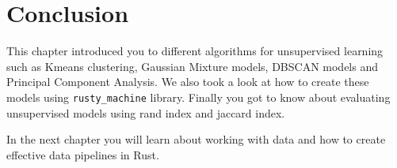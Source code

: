 \documentclass{book}
\begin{document}
\label{sec:testing_an_unsupervised_model}

\section{Conclusion}%
This chapter introduced you to different algorithms for unsupervised learning such as Kmeans clustering, Gaussian Mixture models, DBSCAN models and Principal Component Analysis. We also took a look at how to create these models using \lstinline{rusty_machine} library. Finally you got to know about evaluating unsupervised models using rand index and jaccard index.

In the next chapter you will learn about working with data and how to create effective data pipelines in Rust.
\label{sec:conclusion}



\printbibliography
\nocite{*}
\end{document}
